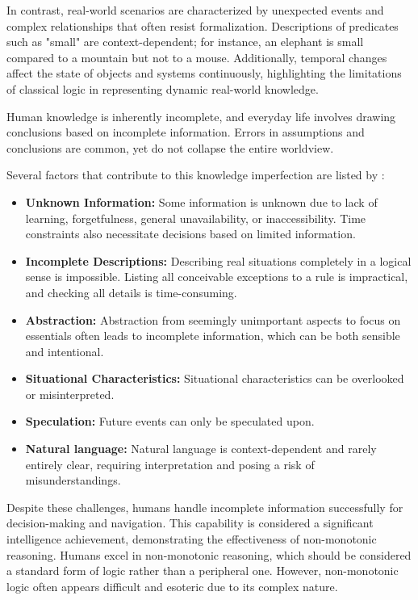 In contrast, real-world scenarios are characterized by unexpected events and complex relationships that often resist formalization.
Descriptions of predicates such as "small" are context-dependent; for instance, an elephant is small compared to a mountain but not to a mouse.
Additionally, temporal changes affect the state of objects and systems continuously, highlighting the limitations of classical logic in representing dynamic real-world knowledge.

Human knowledge is inherently incomplete, and everyday life involves drawing conclusions based on incomplete information.
Errors in assumptions and conclusions are common, yet do not collapse the entire worldview.

Several factors that contribute to this knowledge imperfection are listed by \cite{beierle_methoden_2019}:
\begin{itemize}
      \item \textbf{Unknown Information:} Some information is unknown due to lack of learning, forgetfulness, general unavailability, or inaccessibility.
            Time constraints also necessitate decisions based on limited information.
      \item \textbf{Incomplete Descriptions:} Describing real situations completely in a logical sense is impossible.
            Listing all conceivable exceptions to a rule is impractical, and checking all details is time-consuming.
      \item \textbf{Abstraction:} Abstraction from seemingly unimportant aspects to focus on essentials often leads to incomplete information, which can be both sensible and intentional.
      \item \textbf{Situational Characteristics:} Situational characteristics can be overlooked or misinterpreted.
      \item \textbf{Speculation:} Future events can only be speculated upon.
      \item \textbf{Natural language:} Natural language is context-dependent and rarely entirely clear, requiring interpretation and posing a risk of misunderstandings.
\end{itemize}

Despite these challenges, humans handle incomplete information successfully for decision-making and navigation.
This capability is considered a significant intelligence achievement, demonstrating the effectiveness of non-monotonic reasoning.
Humans excel in non-monotonic reasoning, which should be considered a standard form of logic rather than a peripheral one.
However, non-monotonic logic often appears difficult and esoteric due to its complex nature.

